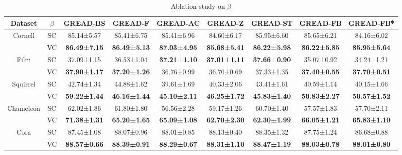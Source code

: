 \documentclass{article}
\theoremstyle{plain}
\theoremstyle{definition}
\theoremstyle{remark}
\newcommand{\std}{\scriptsize{}}
\begin{document}
\begin{table}[h!]
     \small
     \centering
\caption{Ablation study on $\beta$}
     \label{tab:beta_appendix}
     \begin{tabular}{cc cccc ccc}\toprule
        Dataset & $\beta$ &  GREAD-BS & GREAD-F & GREAD-AC & GREAD-Z & GREAD-ST & GREAD-FB & GREAD-FB*\\
        \midrule \multirow{2}{*}{Cornell}
        & SC    &  85.14\std{±5.57} & 85.41\std{±6.75} & 85.41\std{±6.96} & 84.60\std{±6.17} & 85.95\std{±6.60} & 85.65\std{±6.21} & 84.16\std{±6.02}\\
        & VC    &  \textbf{86.49\std{±7.15}} & \textbf{86.49\std{±5.13}} & \textbf{87.03\std{±4.95}} & \textbf{85.68\std{±5.41}} & \textbf{86.22\std{±5.98}} & \textbf{86.22\std{±5.85}} & \textbf{85.95\std{±5.64}}\\
        \midrule \multirow{2}{*}{Film}
        & SC    &  37.09\std{±1.15} & 36.53\std{±1.04} & \textbf{37.21\std{±1.10}} & \textbf{37.01\std{±1.11}} & \textbf{37.66\std{±0.90}} & 35.07\std{±0.92} & 34.24\std{±1.21}\\
        & VC    &  \textbf{37.90\std{±1.17}} & \textbf{37.20\std{±1.26}} & 36.76\std{±0.99} & 36.70\std{±0.69} & 37.33\std{±1.35} & \textbf{37.40\std{±0.55}} & \textbf{37.70\std{±0.51}}\\
        \midrule \multirow{2}{*}{Squirrel}
        & SC    &  42.74\std{±1.34} & 44.88\std{±1.62} & 39.61\std{±1.69} & 40.33\std{±2.06} & 43.41\std{±1.61} & 40.59\std{±1.14} & 40.15\std{±1.66}\\
        & VC    &  \textbf{59.22\std{±1.44}} & \textbf{46.16\std{±1.44}} & \textbf{45.10\std{±2.11}} & \textbf{46.25\std{±1.72}} & \textbf{45.83\std{±1.40}} & \textbf{50.83\std{±2.27}} & \textbf{50.57\std{±1.52}}\\
        \midrule \multirow{2}{*}{Chameleon}
        & SC    & 62.02\std{±1.86} & 61.80\std{±1.80} & 56.56\std{±2.28} & 59.17\std{±1.26} & 60.70\std{±1.40} & 57.57\std{±1.83} & 57.70\std{±2.11} \\
        & VC    & \textbf{71.38\std{±1.31}} & \textbf{65.20\std{±1.65}} & \textbf{65.09\std{±1.08}} & \textbf{62.70\std{±2.30}} & \textbf{62.30\std{±1.99}} & \textbf{66.05\std{±1.21}} & \textbf{65.83\std{±1.10}} \\
        \midrule \multirow{2}{*}{Cora}
        & SC    &  87.45\std{±1.08} & 88.07\std{±0.96} & 88.01\std{±0.85} & 88.13\std{±0.40} & 88.35\std{±1.32} & 87.75\std{±1.24} & 86.68\std{±0.88} \\
        & VC    &  \textbf{88.57\std{±0.66}} & \textbf{88.39\std{±0.91}} & \textbf{88.29\std{±0.67}} & \textbf{88.31\std{±1.10}} & \textbf{88.47\std{±1.19}} & \textbf{88.03\std{±0.78}} & \textbf{88.01\std{±0.80}} \\

\end{tabular}
\end{table}
\end{document}
